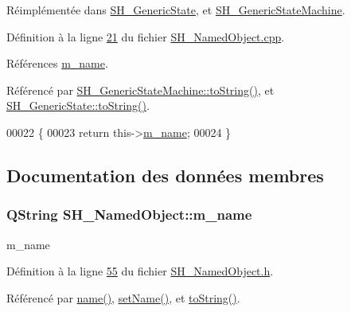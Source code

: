 Réimplémentée dans \hyperlink{classSH__GenericState_a7779babbb40f3f8faa71112204d9804f}{S\-H\-\_\-\-Generic\-State}, et \hyperlink{classSH__GenericStateMachine_a85c0c1c9d258ae991f84667412fa47cd}{S\-H\-\_\-\-Generic\-State\-Machine}.



Définition à la ligne \hyperlink{SH__NamedObject_8cpp_source_l00021}{21} du fichier \hyperlink{SH__NamedObject_8cpp_source}{S\-H\-\_\-\-Named\-Object.\-cpp}.



Références \hyperlink{classSH__NamedObject_a7f8e3346256986c337a792339ea5a015}{m\-\_\-name}.



Référencé par \hyperlink{classSH__GenericStateMachine_a85c0c1c9d258ae991f84667412fa47cd}{S\-H\-\_\-\-Generic\-State\-Machine\-::to\-String()}, et \hyperlink{classSH__GenericState_a7779babbb40f3f8faa71112204d9804f}{S\-H\-\_\-\-Generic\-State\-::to\-String()}.


\begin{DoxyCode}
00022 \{
00023     \textcolor{keywordflow}{return} this->\hyperlink{classSH__NamedObject_a7f8e3346256986c337a792339ea5a015}{m\_name};
00024 \}
\end{DoxyCode}


\subsection{Documentation des données membres}
\hypertarget{classSH__NamedObject_a7f8e3346256986c337a792339ea5a015}{
\subsubsection[{m\-\_\-name}]{\setlength{\rightskip}{0pt plus 5cm}Q\-String S\-H\-\_\-\-Named\-Object\-::m\-\_\-name\hspace{0.3cm}{\ttfamily [private]}}}\label{classSH__NamedObject_a7f8e3346256986c337a792339ea5a015}


m\-\_\-name 



Définition à la ligne \hyperlink{SH__NamedObject_8h_source_l00055}{55} du fichier \hyperlink{SH__NamedObject_8h_source}{S\-H\-\_\-\-Named\-Object.\-h}.



Référencé par \hyperlink{classSH__NamedObject_a9f686c6f2a5bcc08ad03d0cee0151f0f}{name()}, \hyperlink{classSH__NamedObject_a6bc164e6fa10ae190770529af75d1775}{set\-Name()}, et \hyperlink{classSH__NamedObject_a9f4b19df6a96a17daaf1060b3019ef47}{to\-String()}.

